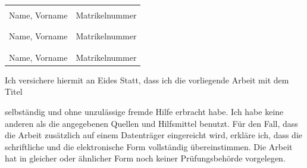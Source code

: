 \documentclass[12pt, a4paper, oneside]{article}
\begin{document}
\vspace{0.3cm}

\begin{tabular}{@{}p{8cm}p{5.8cm}}
	\underline{\hspace{6cm}} & \underline{\hspace{5.8cm}} \\
	\vspace{0.02cm}Name, Vorname & \vspace{0.02cm}Matrikelnummer \\
	&\\
	\underline{\hspace{6cm}} & \underline{\hspace{5.8cm}} \\
	\vspace{0.02cm}Name, Vorname & \vspace{0.02cm}Matrikelnummer \\
	&\\
	\underline{\hspace{6cm}} & \underline{\hspace{5.8cm}} \\
	\vspace{0.02cm}Name, Vorname & \vspace{0.02cm}Matrikelnummer \\
\end{tabular}
\vspace{0.3cm}

Ich versichere hiermit an Eides Statt, dass ich die vorliegende Arbeit mit dem Titel

\begin{center}
	{\makeatletter{\emph{{\@title}}}\makeatother}
\end{center}

selbständig und ohne unzulässige fremde Hilfe erbracht habe. Ich habe keine anderen als die angegebenen Quellen und Hilfsmittel benutzt. Für den Fall, dass die Arbeit zusätzlich auf einem Datenträger eingereicht wird, erkläre ich, dass die schriftliche und die elektronische Form vollständig übereinstimmen. Die Arbeit hat in gleicher oder ähnlicher Form noch keiner Prüfungsbehörde vorgelegen.

\vspace{0.6cm}
\end{document}
